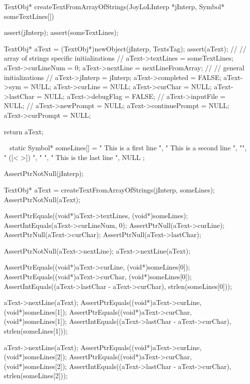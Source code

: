 \startCCode
TextObj* createTextFromArrayOfStrings(JoyLoLInterp *jInterp,
                                      Symbol* someTextLines[]) {
  assert(jInterp);
  assert(someTextLines);
  
  TextObj* aText = (TextObj*)newObject(jInterp, TextsTag);
  assert(aText);
  //
  // array of strings specific initializations
  //
  aText->textLines  = someTextLines;
  aText->curLineNum = 0;
  aText->nextLine   = nextLineFromArray;
  //
  // general initializations
  //
  aText->jInterp    = jInterp;
  aText->completed  = FALSE;
  aText->sym        = NULL;
  aText->curLine    = NULL;
  aText->curChar    = NULL;
  aText->lastChar   = NULL;
  aText->debugFlag  = FALSE;
  //
  aText->inputFile  = NULL;
  //
  aText->newPrompt       = NULL;
  aText->continuePrompt  = NULL;
  aText->curPrompt       = NULL;

  return aText;
}
\stopCCode

\CTestsSetup\
\startCTest
static Symbol* someLines[] = {
  "  This is a first line  ",
  "  This is a second line   ",
  "",
  " ([<{ }>]) ",
  "     	",
  "  This is the last line  ",
  NULL
};
\stopCTest

\startCTest
  AssertPtrNotNull(jInterp);

  TextObj* aText = createTextFromArrayOfStrings(jInterp, someLines);
  AssertPtrNotNull(aText);

  AssertPtrEquals((void*)aText->textLines, (void*)someLines);
  AssertIntEquals(aText->curLineNum, 0);
  AssertPtrNull(aText->curLine);
  AssertPtrNull(aText->curChar);
  AssertPtrNull(aText->lastChar);
  
  AssertPtrNotNull(aText->nextLine);
  aText->nextLine(aText);

  AssertPtrEquals((void*)aText->curLine, (void*)someLines[0]);
  AssertPtrEquals((void*)aText->curChar, (void*)someLines[0]);
  AssertIntEquals((aText->lastChar - aText->curChar),
                        strlen(someLines[0]));

  aText->nextLine(aText);
  AssertPtrEquals((void*)aText->curLine, (void*)someLines[1]);
  AssertPtrEquals((void*)aText->curChar, (void*)someLines[1]);
  AssertIntEquals((aText->lastChar - aText->curChar),
                        strlen(someLines[1]));

  aText->nextLine(aText);
  AssertPtrEquals((void*)aText->curLine, (void*)someLines[2]);
  AssertPtrEquals((void*)aText->curChar, (void*)someLines[2]);
  AssertIntEquals((aText->lastChar - aText->curChar),
                        strlen(someLines[2]));

